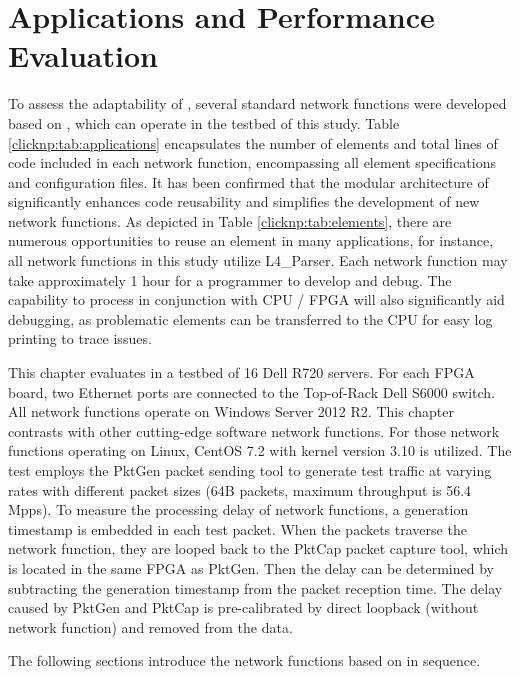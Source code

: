 \section{Applications and Performance Evaluation}
\label{clicknp:sec:application}
\label{clicknp:sec:eval}

To assess the adaptability of \name, several standard network functions were developed based on \name, which can operate in the testbed of this study. Table \ref {clicknp:tab:applications} encapsulates the number of elements and total lines of code included in each network function, encompassing all element specifications and configuration files. It has been confirmed that the modular architecture of \name significantly enhances code reusability and simplifies the development of new network functions. As depicted in Table \ref {clicknp:tab:elements}, there are numerous opportunities to reuse an element in many applications, for instance, all network functions in this study utilize L4\_Parser. Each network function may take approximately 1 hour for a programmer to develop and debug. The capability to process in conjunction with CPU / FPGA will also significantly aid debugging, as problematic elements can be transferred to the CPU for easy log printing to trace issues.

This chapter evaluates \name in a testbed of 16 Dell R720 servers. For each FPGA board, two Ethernet ports are connected to the Top-of-Rack Dell S6000 switch\cite {dells6000}. All \name network functions operate on Windows Server 2012 R2. This chapter contrasts \name with other cutting-edge software network functions. For those network functions operating on Linux, CentOS 7.2 with kernel version 3.10 is utilized. The test employs the PktGen packet sending tool to generate test traffic at varying rates with different packet sizes (64B packets, maximum throughput is 56.4 Mpps). To measure the processing delay of network functions, a generation timestamp is embedded in each test packet. When the packets traverse the network function, they are looped back to the PktCap packet capture tool, which is located in the same FPGA as PktGen. Then the delay can be determined by subtracting the generation timestamp from the packet reception time. The delay caused by PktGen and PktCap is pre-calibrated by direct loopback (without network function) and removed from the data.

The following sections introduce the network functions based on \name in sequence.


